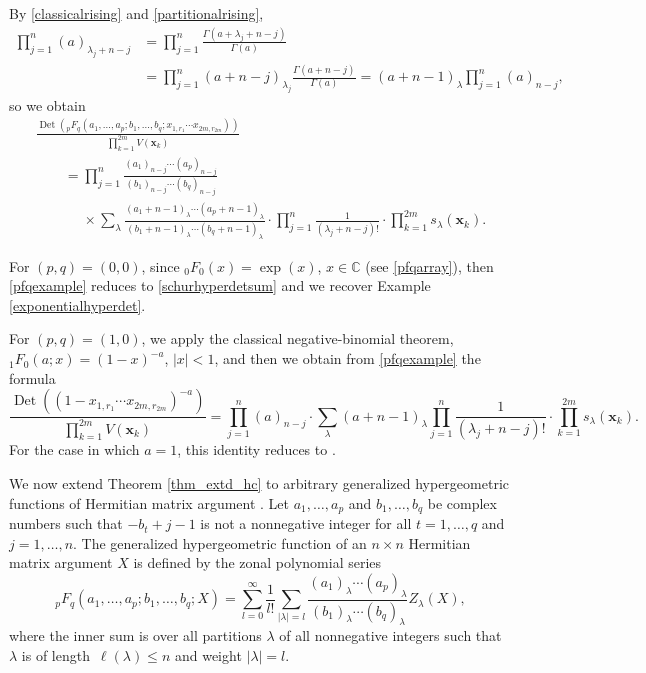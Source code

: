 \documentclass[10pt,a4paper]{amsart}
\numberwithin{equation}{section}
\def\C{{\mathbb C}}
\def\Det{\operatorname{Det}}
\def\xx{\boldsymbol{x}}
\begin{document}
\begin{Example}
By \eqref{classicalrising} and \eqref{partitionalrising},
\begin{align*}
\prod_{j=1}^n (a)_{\lambda_j+n-j} &= \prod_{j=1}^n \frac{\Gamma(a+\lambda_j+n-j)}{\Gamma(a)} \\
&= \prod_{j=1}^n (a+n-j)_{\lambda_j} \frac{\Gamma(a+n-j)}{\Gamma(a)}
= (a+n-1)_\lambda \prod_{j=1}^n (a)_{n-j},
\end{align*}
so we obtain
\begin{gather}
 \frac{\Det({}_pF_q(a_1,\dots,a_p;b_1,\dots,b_q;x_{1,r_1} \cdots x_{2m,r_{2m}}))}{\prod_{k=1}^{2m} V(\xx_k)} \nonumber \\
\qquad
= \prod_{j=1}^n \frac{(a_1)_{n-j} \cdots (a_p)_{n-j}}{(b_1)_{n-j} \cdots (b_q)_{n-j}} \nonumber \\
\phantom{\qquad
=}{} \times \sum_\lambda \frac{(a_1+n-1)_\lambda \cdots (a_p+n-1)_\lambda}{(b_1+n-1)_\lambda \cdots (b_q+n-1)_\lambda} \cdot \prod_{j=1}^n \frac{1}{(\lambda_j+n-j)!} \cdot \prod_{k=1}^{2m} s_\lambda(\xx_k).\label{pfqexample}
\end{gather}

For $(p,q) = (0,0)$, since ${}_0F_0(x) = \exp(x)$, $x \in \C$ (see \eqref{pfqarray}), then \eqref{pfqexample} reduces to \eqref{schurhyperdetsum} and we recover Example \ref{exponentialhyperdet}.

For $(p,q) = (1,0)$, we apply the classical negative-binomial theorem, ${}_1F_0(a;x) = (1-x)^{-a}$, $|x| < 1$, and then we obtain from \eqref{pfqexample} the formula
\[
\frac{\Det((1-x_{1,r_1} \cdots x_{2m,r_{2m}})^{-a})}{\prod_{k=1}^{2m} V(\xx_k)}
= \prod_{j=1}^n (a)_{n-j} \cdot \sum_\lambda (a+n-1)_\lambda \prod_{j=1}^n \frac{1}{(\lambda_j+n-j)!} \cdot \prod_{k=1}^{2m} s_\lambda(\xx_k).
\]
For the case in which $a = 1$, this identity reduces to \cite[Corollary 3.2]{matsumoto}.
\end{Example}

We now extend Theorem \ref{thm_extd_hc} to arbitrary generalized hypergeometric functions of Hermitian matrix argument \cite{grossrichards87,grossrichards89}. Let $a_1,\dots,a_p$ and $b_1,\dots,b_q$ be complex numbers such that $-b_t+j-1$ is not a nonnegative integer for all $t=1,\dots,q$ and $j=1,\dots,n$. The generalized hypergeometric function of an $n \times n$ Hermitian matrix argument $X$ is defined by the zonal polynomial series
\begin{equation}
\label{matrixargpfq}
{}_pF_q(a_1,\dots,a_p;b_1,\dots,b_q;X) = \sum_{l=0}^\infty \frac{1}{l!} \sum_{|\lambda|=l} \frac{(a_1)_\lambda\cdots (a_p)_\lambda}{(b_1)_\lambda \cdots (b_q)_\lambda} Z_\lambda(X),
\end{equation}
where the inner sum is over all partitions $\lambda$ of all nonnegative integers such that $\lambda$ is of length~${\ell(\lambda) \le n}$ and weight $|\lambda|=l$.
\end{document}
